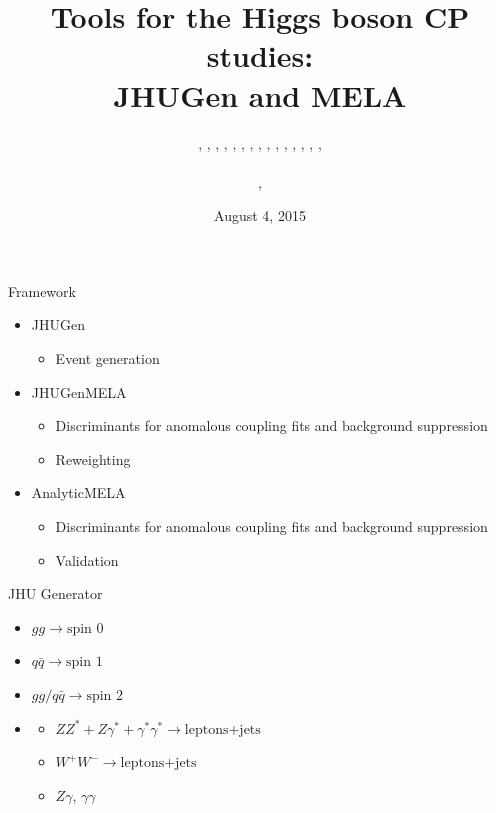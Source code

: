 \documentclass[usenames,dvipsnames,svgnames,table]{beamer}
\title[JHUGen and MELA]{Tools for the Higgs boson CP studies: \\ JHUGen and MELA}
\author[Heshy Roskes]{\CMS{I. Anderson}, \CMS{S. Bolognesi}, \theory{F. Caola}, \ATLAS{Y. Gao}, \CMS{A. Gritsan}, \CMS{Z. Guo}, \CMS{C. Martin}, \theory{K. Melnikov}, \me{H. Roskes}, \CMS{U. Sarica}, \theory{M. Schulze}, \CMS{N. Tran}, \CMS{A. Whitbeck}, \CMS{M. Xiao}, \CMS{C. You}, \theory{Y. Zhou}
\texorpdfstring{\\ \leavevmode
\\
\theory{Theory}, \experiment{experiment}}{}}
\date{August 4, 2015}
\newcommand{\spin}[1]{\text{spin }#1}
\begin{document}
\begin{frame}
\titlepage
\end{frame}

\begin{frame}{Framework}

\begin{itemize}
\small
\item JHUGen
\begin{itemize}
\item Event generation
\end{itemize}
\item JHUGenMELA
\begin{itemize}
\item Discriminants for anomalous coupling fits and background suppression
\item Reweighting
\end{itemize}
\item AnalyticMELA
\begin{itemize}
\item Discriminants for anomalous coupling fits and background suppression
\item Validation
\end{itemize}
\end{itemize}

\end{frame}


\begin{frame}{JHU Generator}
\begin{itemize}
\item $gg\to\spin{0}$
\item $q\bar{q}\to\spin{1}$
\item $gg/q\bar{q}\to\spin{2}$
\end{itemize}
\begin{itemize}
\item
\begin{itemize}[label={$\to$}]
\item $ZZ^*+Z\gamma^*+\gamma^*\gamma^*\to \text{leptons+jets}$
\item $W^+W^-\to \text{leptons+jets}$
\item $Z\gamma$, $\gamma\gamma$
\end{itemize}
\end{itemize}
\end{frame}
\end{document}

